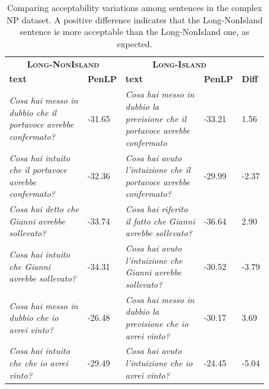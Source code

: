 \begin{table} \scriptsize 
	\begin{center}
		\begin{tabular}
			{p{0.3\linewidth} p{0.08\linewidth} p{0.3\linewidth} p{0.08\linewidth} p{0.08\linewidth}|} \\
			\multicolumn{2}{c}{\textbf{\textsc{Long-NonIsland}}} & \multicolumn{2}{c}{\textbf{\textsc{Long-Island}}}  &   \\
			\textbf{text} & \textbf{PenLP} & \textbf{text} & \textbf{PenLP} &  \textbf{Diff}  \\
			\hline
			\textit{Cosa hai messo in dubbio che il portavoce avrebbe confermato?} & -31.65
			& \textit{Cosa hai messo in dubbio la previsione che il portavoce avrebbe confermato} & -33.21 & 1.56 \\ 
			\textit{Cosa hai intuito che il portavoce avrebbe confermato?} & -32.36 
			& \textit{Cosa hai avuto l'intuizione che il portavoce avrebbe confermato?} & -29.99 & -2.37 \\ 	
			\textit{Cosa hai detto che Gianni avrebbe sollevato?} & -33.74 
			& \textit{Cosa hai riferito il fatto che Gianni avrebbe sollevato?} & -36.64 & 2.90 \\ 
			\textit{Cosa hai intuito che Gianni avrebbe sollevato?} & -34.31 
			& \textit{Cosa hai avuto l'intuizione che Gianni avrebbe sollevato?} & -30.52  & -3.79 \\ 
			
			\textit{Cosa hai messo in dubbio che io avrei vinto?} & -26.48 & 
			\textit{Cosa hai messo in dubbio la previsione che io avrei vinto?} & -30.17 & 3.69\\ 				
			\textit{Cosa hai intuito che che io avrei vinto?} & -29.49 & 
			\textit{Cosa hai avuto l'intuizione che io avrei vinto?} & -24.45  & -5.04 \\ 				

		\end{tabular}
		\caption{Comparing acceptability variations among sentences in the complex NP dataset. A positive difference indicates that the Long-NonIsland sentence is more acceptable than the Long-NonIsland one, as expected.}
		\label{tab:compare1}
	\end{center}
\end{table}


